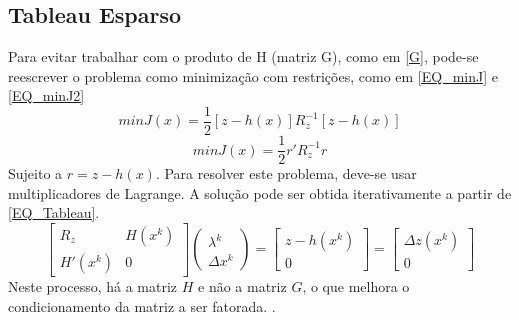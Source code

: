 \subsection{Tableau Esparso}
Para evitar trabalhar com o produto de H (matriz G), como em \ref{G}, pode-se reescrever o problema como minimização com restrições, como em \ref{EQ_minJ} e \ref{EQ_minJ2}
\begin{equation}
    minJ(x) = \frac{1}{2}[z-h(x)]R_z^{-1} [z-h(x)]
    \label{EQ_minJ}
\end{equation}
\begin{equation}
    minJ(x) = \frac{1}{2}r'R_z^{-1}r
    \label{EQ_minJ2}
\end{equation}
Sujeito a $r = z-h(x)$. 
Para resolver este problema, deve-se usar multiplicadores de Lagrange. A solução pode ser obtida iterativamente a partir de \ref{EQ_Tableau}.
\begin{equation}
    \left[ 
    \begin{matrix} 
        R_z & H(x^k) \\
        H'(x^k) & 0
    \end{matrix} \right] \left( 
    \begin{matrix} 
        \lambda^k \\
        \Delta x^k
    \end{matrix} \right) = \left[ 
    \begin{matrix} 
        z-h(x^k) \\
        0
    \end{matrix} \right]= \left[ 
    \begin{matrix} 
        \Delta z(x^k) \\
        0
    \end{matrix} \right]
    \label{EQ_Tableau}
\end{equation}
Neste processo, há a matriz $H$ e não a matriz $G$, o que melhora o condicionamento da matriz a ser fatorada. \cite{castro}. 

